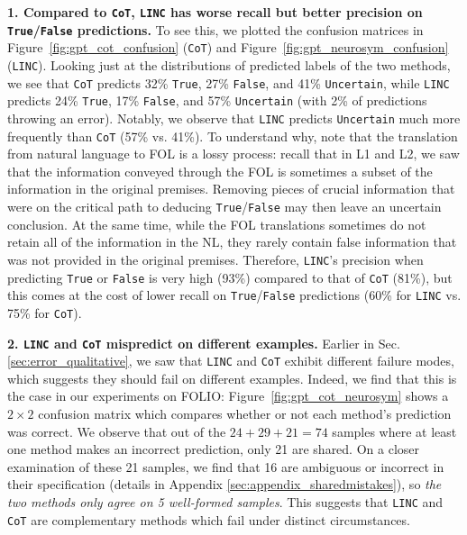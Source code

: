 \documentclass[11pt]{article}
\begin{document}
\textbf{1. Compared to \texttt{CoT}, \texttt{LINC} has worse recall but better precision on \texttt{True}/\texttt{False} predictions.} To see this,
we plotted the confusion matrices in Figure~\ref{fig:gpt_cot_confusion} (\texttt{CoT}) and Figure~\ref{fig:gpt_neurosym_confusion} (\texttt{LINC}). 
Looking just at the distributions of predicted labels of the two methods, we see that \texttt{CoT} predicts 32\% \texttt{True}, 27\% \texttt{False}, and 41\% \texttt{Uncertain}, while \texttt{LINC} predicts 24\% \texttt{True}, 17\% \texttt{False}, and 57\% \texttt{Uncertain} (with 2\% of predictions throwing an error).
Notably, we observe that \texttt{LINC} predicts \texttt{Uncertain} much more frequently than \texttt{CoT} (57\% vs. 41\%).
To understand why, note that the translation from natural language to FOL is a lossy process: recall that in L1 and L2, we saw that the information conveyed through the FOL is sometimes a subset of the information in the original premises. Removing pieces of crucial information that were on the critical path to deducing \texttt{True}/\texttt{False} may then leave an uncertain conclusion. 
At the same time, while the FOL translations sometimes do not retain all of the information in the NL, they rarely contain false information that was not provided in the original premises.
Therefore, \texttt{LINC}'s precision when predicting \texttt{True} or \texttt{False} is very high (93\%) compared to that of \texttt{CoT} (81\%), but this comes at the cost of lower recall on \texttt{True}/\texttt{False} predictions (60\% for \texttt{LINC} vs. 75\% for \texttt{CoT}).

\textbf{2. \texttt{LINC} and \texttt{CoT} mispredict on different examples.} Earlier in Sec. \ref{sec:error_qualitative}, we saw that \texttt{LINC} and \texttt{CoT} exhibit different failure modes, which suggests they should fail on different examples. Indeed, we find that this is the case in our experiments on FOLIO:
Figure~\ref{fig:gpt_cot_neurosym} shows a $2\times2$ confusion matrix which compares whether or not each method's prediction was correct.
We observe that out of the $24+29+21=74$ samples where at least one method makes an incorrect prediction, only 21 are shared.
On a closer examination of these 21 samples, we find that 16 are ambiguous or incorrect in their specification (details in Appendix \ref{sec:appendix_sharedmistakes}), so \textit{the two methods only agree on 5 well-formed samples}.
This suggests that \texttt{LINC} and \texttt{CoT} are complementary methods which fail under distinct circumstances.
\end{document}
